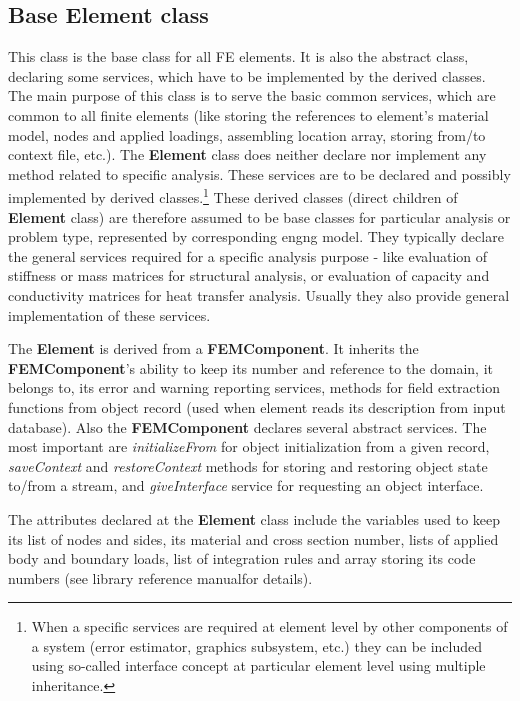 \documentclass[a4paper]{article}
\newcommand{\class}[1]{{\bf #1}}
\newcommand{\service}[1]{{\em #1}}
\newcommand{\refman}{\oofem library reference manual}
\begin{document}
\subsection{Base Element class}
This class is the base class for all FE elements. It is also the
abstract class, declaring some services, which have to be implemented
by the derived classes. The main purpose of this class is to serve the
basic common services, which are common to all finite elements (like
storing the references to element's material model, nodes and applied
loadings, assembling location array, storing
from/to context file, etc.). The \class{Element} class does neither declare nor
implement any method related to specific analysis. These services are to be declared
and possibly implemented by derived classes.\footnote{
When a specific services are required at element level by other
components of a system (error estimator, graphics subsystem, etc.)
they can be included using so-called interface concept at particular
element level using  multiple inheritance.} These derived classes
(direct children of \class{Element} class) are therefore assumed to be base
classes for particular analysis or problem type, represented by
corresponding engng model. They typically
declare the general services required for a specific analysis purpose
- like evaluation of stiffness or mass matrices for structural
analysis, or evaluation of capacity and conductivity matrices for heat
transfer analysis. Usually they also provide general implementation of
these services.

The \class{Element} is derived from a \class{FEMComponent}. It inherits
the \class{FEMComponent}'s ability to keep its number and reference
to the domain, it belongs to, its error and warning
reporting services, methods for field extraction functions from object
record (used when element reads its description from input database).
Also the \class{FEMComponent} declares several abstract services. The most
important are \service{initializeFrom} for object
initialization from a given record, \service{saveContext} and
\service{restoreContext} methods for storing and restoring object state
to/from a stream, and \service{giveInterface} service for requesting
an object interface.

The attributes declared at the \class{Element} class include the 
variables used to keep its list of nodes and sides, its material
and cross section number, lists of applied body and boundary loads,
list of integration rules and array storing its code numbers
(see \refman for details).
\end{document}
